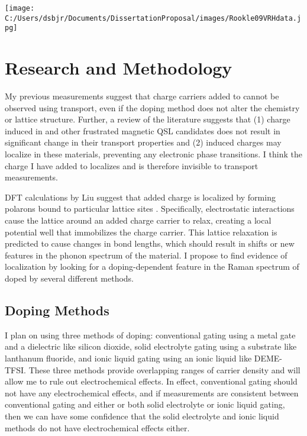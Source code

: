 \documentclass[11pt]{article}
\newenvironment{Figure}
  {\par\medskip\noindent\minipage{\linewidth}}
  {\endminipage\par\medskip}
\begin{document}
\begin{multicols}{2}
\begin{Figure}
		{\texttt{[image: C:/Users/dsbjr/Documents/DissertationProposal/images/Rookle09VRHdata.jpg]}\label{fig:f3}}
\end{Figure}

\section{Research and Methodology}

My previous measurements suggest that charge carriers added to \rucl cannot be observed using transport, even if the doping method does not alter the chemistry or lattice structure. Further, a review of the literature suggests that (1) charge induced in \rucl and other frustrated magnetic QSL candidates does not result in significant change in their transport properties and (2) induced charges may localize in these materials, preventing any electronic phase transitions. I think the charge I have added to \rucl localizes and is therefore invisible to transport measurements.

DFT calculations by Liu suggest that added charge is localized by forming polarons bound to particular lattice sites \cite{Liu2018}. Specifically, electrostatic interactions cause the lattice around an added charge carrier to relax, creating a local potential well that immobilizes the charge carrier. This lattice relaxation is predicted to cause changes in bond lengths, which should result in shifts or new features in the phonon spectrum of the material. I propose to find evidence of localization by looking for a doping-dependent feature in the Raman spectrum of \rucl doped by several different methods.

\subsection{Doping Methods}

I plan on using three methods of doping: conventional gating using a metal gate and a dielectric like silicon dioxide, solid electrolyte gating using a substrate like lanthanum fluoride, and ionic liquid gating using an ionic liquid like DEME-TFSI. These three methods provide overlapping ranges of carrier density and will allow me to rule out electrochemical effects. In effect, conventional gating should not have any electrochemical effects, and if measurements are consistent between conventional gating and either or both solid electrolyte or ionic liquid gating, then we can have some confidence that the solid electrolyte and ionic liquid methods do not have electrochemical effects either.


\end{multicols}
\end{document}
